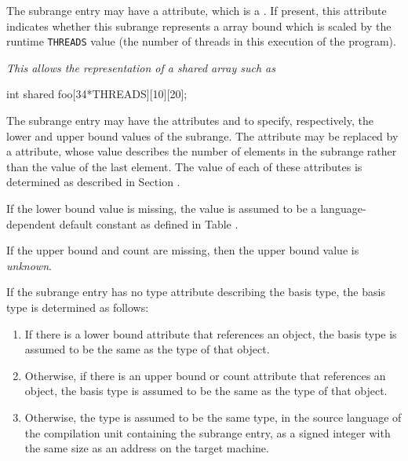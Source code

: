 {The\hypertarget{chap:DWATthreadsscaledupcarrayboundthreadsscalfactor}{}
subrange entry may have a 
\DWATthreadsscaledDEFN{} attribute,
which is a . 
If present, this attribute indicates whether
this subrange represents a  array bound which is scaled
by the runtime \texttt{THREADS} value (the number of  threads in
this execution of the program).

\textit{This allows the representation of a  shared array such as}

\begin{nlnlisting}
int shared foo[34*THREADS][10][20];
\end{nlnlisting}

The\hypertarget{chap:DWATlowerboundlowerboundofsubrange}{}
subrange\hypertarget{chap:DWATupperboundupperboundofsubrange}{}
entry may have the attributes 
\DWATlowerboundDEFN{}
and \DWATupperboundDEFN{}
 to specify, respectively, the lower
and upper bound values of the subrange. The 
\DWATupperboundNAME{} 
attribute\hypertarget{chap:DWATcountelementsofsubrangetype}{}
may be replaced by a
\DWATcountDEFN{} attribute, 
whose value describes the number of elements in the subrange 
rather than the value of the last element. The value of each 
of these attributes is determined as described in 
Section .

If the lower bound value is missing, the value is assumed to
be a language-dependent default constant as defined in
Table .

If the upper bound and count are missing, then the upper bound value is 
\textit{unknown}.

If the subrange entry has no type attribute describing the
basis type, the basis type is determined as follows:
\begin{enumerate}[1. ]
\item
If there is a lower bound attribute that references an object,
the basis type is assumed to be the same as the type of that object.
\item
Otherwise, if there is an upper bound or count attribute that references
an object, the basis type is assumed to be the same as the type of that object.
\item
Otherwise, the type is
assumed to be the same type, in the source language of the
compilation unit containing the subrange entry, as a signed
integer with the same size as an address on the target machine.
\end{enumerate}

}
